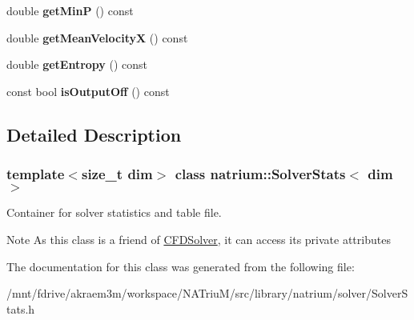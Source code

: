 \begin{DoxyCompactItemize}
\item 
\hypertarget{classnatrium_1_1SolverStats_a582de4d3fd470f78c03cada1c8ebf959}{
double {\bfseries getMinP} () const }
\label{classnatrium_1_1SolverStats_a582de4d3fd470f78c03cada1c8ebf959}

\item 
\hypertarget{classnatrium_1_1SolverStats_a331dab963d64362612b3378fc9588894}{
double {\bfseries getMeanVelocityX} () const }
\label{classnatrium_1_1SolverStats_a331dab963d64362612b3378fc9588894}

\item 
\hypertarget{classnatrium_1_1SolverStats_a784dddde05eaaa83786abf861cc141ae}{
double {\bfseries getEntropy} () const }
\label{classnatrium_1_1SolverStats_a784dddde05eaaa83786abf861cc141ae}

\item 
\hypertarget{classnatrium_1_1SolverStats_a3675819c1d09da806da1fadc1391b814}{
const bool {\bfseries isOutputOff} () const }
\label{classnatrium_1_1SolverStats_a3675819c1d09da806da1fadc1391b814}

\end{DoxyCompactItemize}


\subsection{Detailed Description}
\subsubsection*{template$<$size\_\-t dim$>$ class natrium::SolverStats$<$ dim $>$}

Container for solver statistics and table file. \begin{DoxyNote}{Note}
As this class is a friend of \hyperlink{classnatrium_1_1CFDSolver}{CFDSolver}, it can access its private attributes 
\end{DoxyNote}


The documentation for this class was generated from the following file:\begin{DoxyCompactItemize}
\item 
/mnt/fdrive/akraem3m/workspace/NATriuM/src/library/natrium/solver/SolverStats.h\end{DoxyCompactItemize}
